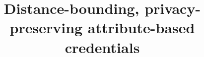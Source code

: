 \documentclass[USenglish]{article}
\begin{document}

\title{%
  Distance-bounding, privacy-preserving attribute-based credentials
}


\end{document}

